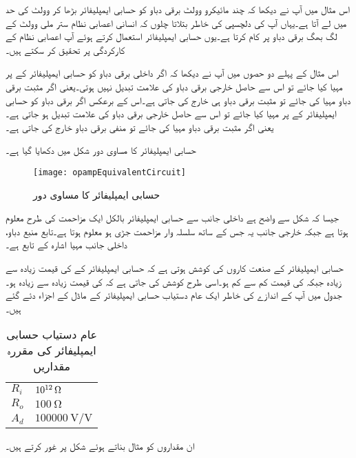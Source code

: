 
	اس مثال میں آپ نے دیکھا کہ چند مائیکرو وولٹ برقی دباو کو حسابی ایمپلیفائر بڑھا کر وولٹ کی حد میں لے آتا ہے۔یہاں آپ کی دلچسپی کی خاطر بتلاتا چلوں کہ انسانی اعصابی نظام  ستر ملی وولٹ  کے لگ بھگ برقی دباو پر کام کرتا ہے۔یوں حسابی ایمپلیفائر استعمال کرتے ہوئے  آپ اعصابی نظام کے کارکردگی پر تحقیق کر سکتے ہیں۔ 

	اس مثال کے پہلے دو حصوں میں آپ نے دیکھا کہ اگر داخلی برقی دباو کو حسابی ایمپلیفائر کے   پر مہیا کیا جائے تو اس سے حاصل خارجی برقی دباو کی علامت تبدیل نہیں ہوتی۔یعنی اگر مثبت برقی دباو مہیا کی جائے تو مثبت برقی دباو ہی خارج کی جاتی ہے۔اس کے برعکس اگر برقی دباو کو حسابی ایمپلیفائر کے   پر مہیا کیا جائے تو اس سے حاصل خارجی برقی دباو کی علامت تبدیل ہو جاتی ہے۔یعنی اگر مثبت برقی دباو مہیا کی جائے تو منفی برقی دباو خارج کی جاتی ہے۔

حسابی ایمپلیفائر کا مساوی دور شکل  میں دکھایا گیا ہے۔
\begin{figure}
\centering
\texttt{[image: opampEquivalentCircuit]}
\caption{حسابی ایمپلیفائر کا مساوی دور}
\label{شکل_حسابی_ایمپلیفائر_کا_مساوی_دور}
\end{figure}
جیسا کہ شکل سے واضح ہے داخلی جانب سے حسابی ایمپلیفائر بالکل ایک مزاحمت  کی طرح معلوم ہوتا ہے جبکہ خارجی جانب  یہ  جس کے ساتھ سلسلہ وار مزاحمت  جڑی ہو معلوم ہوتا ہے۔تابع منبع دباو،  داخلی جانب مہیا اشارہ  کے تابع ہے۔

	حسابی ایمپلیفائر کے صنعت کاروں کی کوشش ہوتی ہے کہ حسابی ایمپلیفائر کے   کی قیمت زیادہ سے زیادہ جبکہ    کی قیمت کم سے کم ہو۔اسی طرح کوشش کی جاتی ہے کہ    کی قیمت زیادہ سے زیادہ ہو۔جدول  میں آپ کے اندازے کی خاطر ایک عام دستیاب حسابی ایمپلیفائر کے  ماڈل کے اجزاء دئے گئے ہیں۔
\begin{table}[ht]
\caption{عام دستیاب حسابی ایمپلیفائر کی مقررہ مقداریں}
\label{جدول_حسابی_ایمپلیفائر_عمومی_مقداریں}
\centering
\begin{tabular}{l l}
\toprule
$R_i$ &  $\SI{e{12}}{\ohm}$ \\
$R_o$ & $\SI{100}{\ohm}$\\
$A_d$  & $\SI[per=frac,fraction=nice]{100000}{\volt \per \volt}$ \\
\bottomrule
\end{tabular}
\end{table}
ان مقداروں کو مثال بناتے ہوئے شکل  پر غور کرتے ہیں۔


